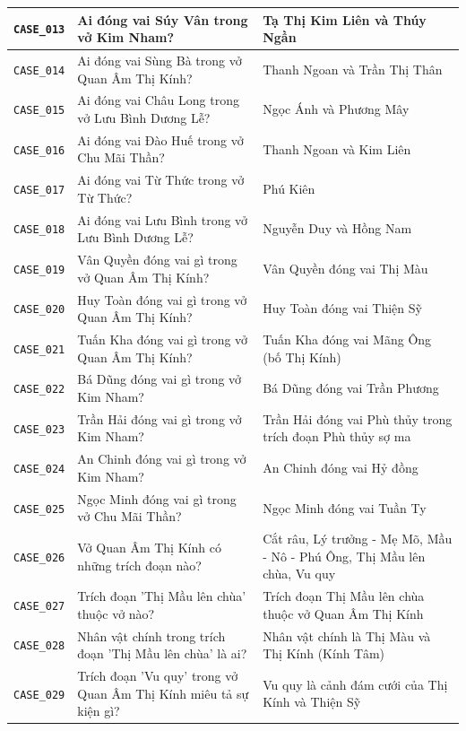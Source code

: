 \begin{longtable}{|p{1.9cm}|p{5.2cm}|p{7.3cm}|}
  \hline
  \texttt{CASE\_013} & Ai đóng vai Súy Vân trong vở Kim Nham? & Tạ Thị Kim Liên và Thúy Ngần \\
  \hline
  \texttt{CASE\_014} & Ai đóng vai Sùng Bà trong vở Quan Âm Thị Kính? & Thanh Ngoan và Trần Thị Thân \\
  \hline
  \texttt{CASE\_015} & Ai đóng vai Châu Long trong vở Lưu Bình Dương Lễ? & Ngọc Ánh và Phương Mây \\
  \hline
  \texttt{CASE\_016} & Ai đóng vai Đào Huế trong vở Chu Mãi Thần? & Thanh Ngoan và Kim Liên \\
  \hline
  \texttt{CASE\_017} & Ai đóng vai Từ Thức trong vở Từ Thức? & Phú Kiên \\
  \hline
  \texttt{CASE\_018} & Ai đóng vai Lưu Bình trong vở Lưu Bình Dương Lễ? & Nguyễn Duy và Hồng Nam \\
  \hline
  \texttt{CASE\_019} & Vân Quyền đóng vai gì trong vở Quan Âm Thị Kính? & Vân Quyền đóng vai Thị Màu \\
  \hline
  \texttt{CASE\_020} & Huy Toàn đóng vai gì trong vở Quan Âm Thị Kính? & Huy Toàn đóng vai Thiện Sỹ \\
  \hline
  \texttt{CASE\_021} & Tuấn Kha đóng vai gì trong vở Quan Âm Thị Kính? & Tuấn Kha đóng vai Mãng Ông (bố Thị Kính) \\
  \hline
  \texttt{CASE\_022} & Bá Dũng đóng vai gì trong vở Kim Nham? & Bá Dũng đóng vai Trần Phương \\
  \hline
  \texttt{CASE\_023} & Trần Hải đóng vai gì trong vở Kim Nham? & Trần Hải đóng vai Phù thủy trong trích đoạn Phù thủy sợ ma \\
  \hline
  \texttt{CASE\_024} & An Chinh đóng vai gì trong vở Kim Nham? & An Chinh đóng vai Hỷ đồng \\
  \hline
  \texttt{CASE\_025} & Ngọc Minh đóng vai gì trong vở Chu Mãi Thần? & Ngọc Minh đóng vai Tuần Ty \\
  \hline
  \texttt{CASE\_026} & Vở Quan Âm Thị Kính có những trích đoạn nào? & Cắt râu, Lý trưởng - Mẹ Mõ, Mầu - Nô - Phú Ông, Thị Mầu lên chùa, Vu quy \\
  \hline
  \texttt{CASE\_027} & Trích đoạn 'Thị Mầu lên chùa' thuộc vở nào? & Trích đoạn Thị Mầu lên chùa thuộc vở Quan Âm Thị Kính \\
  \hline
  \texttt{CASE\_028} & Nhân vật chính trong trích đoạn 'Thị Mầu lên chùa' là ai? & Nhân vật chính là Thị Màu và Thị Kính (Kính Tâm) \\
  \hline
  \texttt{CASE\_029} & Trích đoạn 'Vu quy' trong vở Quan Âm Thị Kính miêu tả sự kiện gì? & Vu quy là cảnh đám cưới của Thị Kính và Thiện Sỹ \\

\end{longtable}
